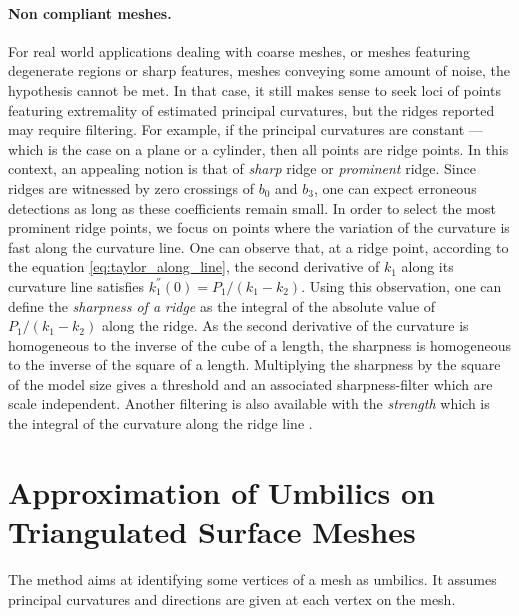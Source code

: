 \paragraph{Non compliant meshes.}
For real world applications dealing with coarse meshes, or meshes
featuring degenerate regions or sharp features, meshes conveying some
amount of noise, the hypothesis \cite{cgal:cp-tdare-05} cannot be
met. In that case, it still makes sense to seek loci of points
featuring extremality of estimated principal curvatures, but the
ridges reported may require filtering. For example, if the principal
curvatures are constant ---which is the case on a plane or a cylinder,
then all points are ridge points. In this context, an appealing notion
is that of {\em sharp} ridge or {\em prominent} ridge. Since ridges
are witnessed by zero crossings of $b_0$ and $b_3$, one can expect
erroneous detections as long as these coefficients remain small. In
order to select the most prominent ridge points, we focus on points
where the variation of the curvature is fast along the curvature line.
One can observe that, at a ridge point, according to the equation
\ref{eq:taylor_along_line}, the second derivative of $k_1$ along its
curvature line satisfies $k_1^{''}(0) = P_1/(k_1-k_2)$.  Using this
observation, one can define the {\em sharpness of a ridge} as the
integral of the absolute value of $P_1/(k_1-k_2)$ along the ridge. As
the second derivative of the curvature is homogeneous to the inverse
of the cube of a length, the sharpness is homogeneous to the inverse
of the square of a length. Multiplying the sharpness by the square of
the model size gives a threshold and an associated sharpness-filter
which are scale independent. Another filtering is also available with
the {\em strength } which is the integral of the curvature along the
ridge line
\cite{cgal:ybs-rvlmi-04}.





\section{Approximation of Umbilics on Triangulated Surface Meshes}
\label{umbilic-mesh}

The method aims at identifying some vertices of a mesh as umbilics. It
assumes principal curvatures and directions are given at each vertex
on the mesh.
%

